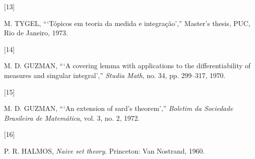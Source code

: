 \documentclass[
]{book}
\newlength{\cslhangindent}
\newlength{\csllabelwidth}
\newenvironment{CSLReferences}[2] %
 {\begin{list}{}{%
  \setlength{\itemindent}{0pt}
  \setlength{\leftmargin}{0pt}
  \setlength{\parsep}{0pt}
  \ifodd #1
   \setlength{\leftmargin}{\cslhangindent}
   \setlength{\itemindent}{-1\cslhangindent}
  \fi
  \setlength{\itemsep}{#2\baselineskip}}}
 {\end{list}}
\newcommand{\CSLLeftMargin}[1]{\parbox[t]{\csllabelwidth}{\strut#1\strut}}
\newcommand{\CSLRightInline}[1]{\parbox[t]{\linewidth - \csllabelwidth}{\strut#1\strut}}
\begin{document}
\begin{CSLReferences}{0}{0}
\CSLLeftMargin{{[}13{]} }%
\CSLRightInline{M. TYGEL, {``{`Tópicos em teoria da medida e integração'},''} Master's thesis, PUC, Rio de Janeiro, 1973.}

\CSLLeftMargin{{[}14{]} }%
\CSLRightInline{M. D. GUZMAN, {``{`A covering lemma with applications to the differentiability of measures and singular integral'},''} \emph{Studia Math}, no. 34, pp. 299--317, 1970.}

\CSLLeftMargin{{[}15{]} }%
\CSLRightInline{M. D. GUZMAN, {``{`An extension of sard's theorem'},''} \emph{Boletim da Sociedade Brasileira de Matemática}, vol. 3, no. 2, 1972.}

\CSLLeftMargin{{[}16{]} }%
\CSLRightInline{P. R. HALMOS, \emph{Naive set theory}. Princeton: Van Nostrand, 1960.}

\end{CSLReferences}
\end{document}
